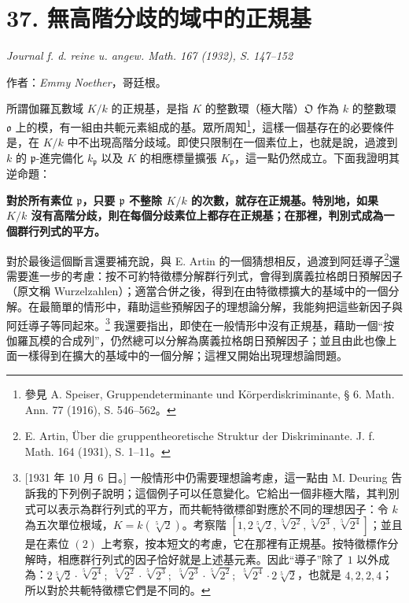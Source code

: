 \documentclass[11pt]{article}
\newcommand{\frakO}{\mathfrak O}
\newcommand{\frako}{\mathfrak o}
\newcommand{\frakp}{\mathfrak p}
\newcommand{\srcemph}[1]{\textbf{#1}}
\begin{document}
\setcounter{footnote}{0}
\section*{37. 無高階分歧的域中的正規基}

\begin{center}
\emph{Journal f. d. reine u. angew. Math. 167 (1932), S. 147--152}
\end{center}

\begin{center}
作者：\emph{Emmy Noether}，哥廷根。
\end{center}

所謂伽羅瓦數域 \(K/k\) 的正規基，是指 \(K\) 的整數環（極大階）\(\frakO\) 作為 \(k\) 的整數環 \(\frako\) 上的模，有一組由共軛元素組成的基。眾所周知\footnote{參見 A. Speiser, Gruppendeterminante und Körperdiskriminante, § 6. Math. Ann. 77 (1916), S. 546--562。}，這樣一個基存在的必要條件是，在 \(K/k\) 中不出現高階分歧域。即使只限制在一個素位上，也就是說，過渡到 \(k\) 的 \(\frakp\)-進完備化 \(k_\frakp\) 以及 \(K\) 的相應標量擴張 \(K_\frakp\)，這一點仍然成立。下面我證明其逆命題：

\srcemph{對於所有素位 \(\frakp\)，只要 \(\frakp\) 不整除 \(K/k\) 的次數，就存在正規基。特別地，如果 \(K/k\) 沒有高階分歧，則在每個分歧素位上都存在正規基；在那裡，判別式成為一個群行列式的平方。}

對於最後這個斷言還要補充說，與 E. Artin 的一個猜想相反，過渡到阿廷導子\footnote{E. Artin, Über die gruppentheoretische Struktur der Diskriminante. J. f. Math. 164 (1931), S. 1--11。}還需要進一步的考慮：按不可約特徵標分解群行列式，會得到廣義拉格朗日預解因子（原文稱 Wurzelzahlen）；適當合併之後，得到在由特徵標擴大的基域中的一個分解。在最簡單的情形中，藉助這些預解因子的理想論分解，我能夠把這些新因子與阿廷導子等同起來。\footnote{[1931 年 10 月 6 日。] 一般情形中仍需要理想論考慮，這一點由 M. Deuring 告訴我的下列例子說明；這個例子可以任意變化。它給出一個非極大階，其判別式可以表示為群行列式的平方，而共軛特徵標卻對應於不同的理想因子：令 \(k\) 為五次單位根域，\(K=k(\sqrt[5]{2})\)。考察階
\([1,2\sqrt[5]{2},\sqrt[5]{2^2},\sqrt[5]{2^3},\sqrt[5]{2^4}]\)；並且是在素位 \((2)\) 上考察，按本短文的考慮，它在那裡有正規基。按特徵標作分解時，相應群行列式的因子恰好就是上述基元素。因此“導子”除了 \(1\) 以外成為：\(2\sqrt[5]{2}\cdot\sqrt[5]{2^4};\;\sqrt[5]{2^2}\cdot\sqrt[5]{2^3};\;\sqrt[5]{2^3}\cdot\sqrt[5]{2^2};\;\sqrt[5]{2^4}\cdot 2\sqrt[5]{2}\)，也就是 \(4,2,2,4\)；所以對於共軛特徵標它們是不同的。} 我還要指出，即使在一般情形中沒有正規基，藉助一個“按伽羅瓦模的合成列”，仍然總可以分解為廣義拉格朗日預解因子；並且由此也像上面一樣得到在擴大的基域中的一個分解；這裡又開始出現理想論問題。
\end{document}
